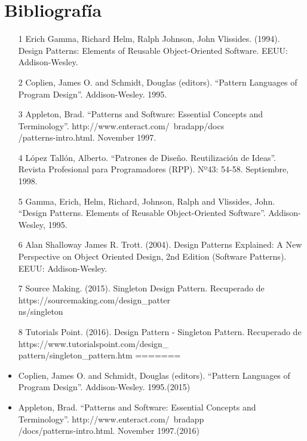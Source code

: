 \documentclass[twoside,twocolumn]{article}
\begin{document}
\begin{itemize}
\begin{itemize}
\begin{itemize}
\begin{itemize}
\end{itemize}



\section{Bibliografía}\label{sec:6}
\begin{itemize}
<<<<<<< HEAD
\item [1] Erich Gamma, Richard Helm, Ralph Johnson, John Vlissides. (1994). Design Patterns: Elements of Reusable Object-Oriented Software. EEUU: Addison-Wesley.
\item [2] Coplien, James O. and Schmidt, Douglas (editors). “Pattern Languages of Program Design”. Addison-Wesley. 1995.
\item [3] Appleton, Brad. “Patterns and Software: Essential Concepts and Terminology”. http://www.enteract.com/~bradapp/docs\\/patterns-intro.html. November 1997.
\item [4] López Tallón, Alberto. “Patrones de Diseño. Reutilización de Ideas”. Revista Profesional para Programadores (RPP). Nº43: 54-58. Septiembre, 1998.
\item [5] Gamma, Erich, Helm, Richard, Johnson, Ralph and Vlissides, John. “Design Patterns. Elements of Reusable Object-Oriented Software”. Addison-Wesley, 1995.
\item [6] Alan Shalloway James R. Trott. (2004). Design Patterns Explained: A New Perspective on Object Oriented Design, 2nd Edition (Software Patterns). EEUU: Addison-Wesley.
\item [7] Source Making. (2015). Singleton Design Pattern. Recuperado de https://sourcemaking.com/design\_patter\\ns/singleton
\item [8] Tutorials Point. (2016). Design Pattern - Singleton Pattern. Recuperado de https://www.tutorialspoint.com/design\_\\pattern/singleton\_pattern.htm
=======
\item Coplien, James O. and Schmidt, Douglas (editors). “Pattern Languages of Program Design”. Addison-Wesley. 1995.(2015)
\item Appleton, Brad. “Patterns and Software: Essential Concepts and Terminology”. http://www.enteract.com/~bradapp \\ /docs/patterns-intro.html. November 1997.(2016)

\end{itemize}
\end{itemize}
\end{itemize}
\end{itemize}
\end{document}
